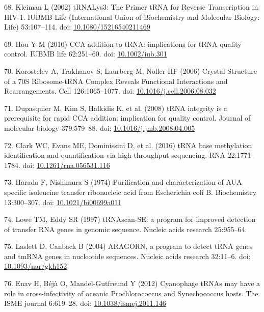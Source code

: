 \documentclass[12pt,twoside]{mitthesis-manusdown}
\begin{document}
\hypertarget{ref-Kleiman2002}{}
68. Kleiman L (2002) tRNALys3: The Primer tRNA for Reverse Transcription
in HIV-1. IUBMB Life (International Union of Biochemistry and Molecular
Biology: Life) 53:107--114. doi:
\href{https://doi.org/10.1080/15216540211469}{10.1080/15216540211469}

\hypertarget{ref-Hou2010}{}
69. Hou Y-M (2010) CCA addition to tRNA: implications for tRNA quality
control. IUBMB life 62:251--60. doi:
\href{https://doi.org/10.1002/iub.301}{10.1002/iub.301}

\hypertarget{ref-Korostelev2006}{}
70. Korostelev A, Trakhanov S, Laurberg M, Noller HF (2006) Crystal
Structure of a 70S Ribosome-tRNA Complex Reveals Functional Interactions
and Rearrangements. Cell 126:1065--1077. doi:
\href{https://doi.org/10.1016/j.cell.2006.08.032}{10.1016/j.cell.2006.08.032}

\hypertarget{ref-Dupasquier2008}{}
71. Dupasquier M, Kim S, Halkidis K, et al. (2008) tRNA integrity is a
prerequisite for rapid CCA addition: implication for quality control.
Journal of molecular biology 379:579--88. doi:
\href{https://doi.org/10.1016/j.jmb.2008.04.005}{10.1016/j.jmb.2008.04.005}

\hypertarget{ref-Clark2016}{}
72. Clark WC, Evans ME, Dominissini D, et al. (2016) tRNA base
methylation identification and quantification via high-throughput
sequencing. RNA 22:1771--1784. doi:
\href{https://doi.org/10.1261/rna.056531.116}{10.1261/rna.056531.116}

\hypertarget{ref-Harada1974}{}
73. Harada F, Nishimura S (1974) Purification and characterization of
AUA specific isoleucine transfer ribonucleic acid from Escherichia coli
B. Biochemistry 13:300--307. doi:
\href{https://doi.org/10.1021/bi00699a011}{10.1021/bi00699a011}

\hypertarget{ref-Lowe1997}{}
74. Lowe TM, Eddy SR (1997) tRNAscan-SE: a program for improved
detection of transfer RNA genes in genomic sequence. Nucleic acids
research 25:955--64.

\hypertarget{ref-Laslett2004}{}
75. Laslett D, Canback B (2004) ARAGORN, a program to detect tRNA genes
and tmRNA genes in nucleotide sequences. Nucleic acids research
32:11--6. doi:
\href{https://doi.org/10.1093/nar/gkh152}{10.1093/nar/gkh152}

\hypertarget{ref-Enav2012}{}
76. Enav H, Béjà O, Mandel-Gutfreund Y (2012) Cyanophage tRNAs may have
a role in cross-infectivity of oceanic Prochlorococcus and Synechococcus
hosts. The ISME journal 6:619--28. doi:
\href{https://doi.org/10.1038/ismej.2011.146}{10.1038/ismej.2011.146}
\end{document}
